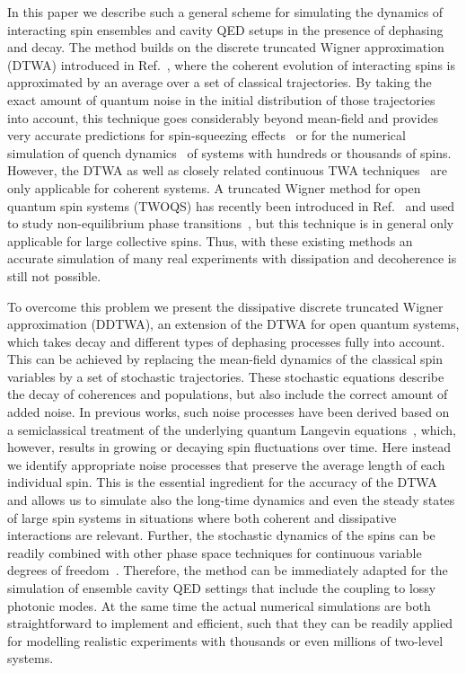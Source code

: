 \documentclass[pra,twocolumn,showpacs,preprintnumbers,amsmath,amssymb,superscriptaddress]{revtex4-1}
\newcommand{\pr}[1]{\textcolor{blue}{#1}}
\begin{document}
In this paper we describe such a general scheme for simulating the dynamics of interacting spin ensembles and cavity QED setups in the presence of dephasing and decay. The method builds on the discrete truncated Wigner approximation (DTWA) introduced in Ref.~\cite{Schachenmayer2015}, where the coherent evolution of interacting spins is approximated by an average over a set of classical trajectories. By taking the exact amount of quantum noise in the initial distribution of those trajectories into account, this technique goes considerably beyond mean-field and provides very accurate predictions for spin-squeezing effects~\cite{Zhu2019,Perlin2020} or for the numerical simulation of quench dynamics~\cite{Czischek2018,Khasseh2020} of systems with hundreds or thousands of spins. However, the DTWA as well as closely related continuous TWA techniques~\cite{Polkovnikov2010} are only applicable for coherent systems. A truncated Wigner method for open quantum spin systems (TWOQS) has recently been introduced in Ref.~\cite{Huber2021} and used to study non-equilibrium phase transitions~\cite{Huber2020}, but this technique is in general only applicable for large collective spins.
Thus, with these existing methods an accurate simulation of many real experiments with dissipation and decoherence is still not possible.


To overcome this problem we present the dissipative discrete truncated Wigner approximation (DDTWA), an extension of the DTWA for open quantum systems, which takes decay and different types of dephasing processes fully into account. This can be achieved by replacing the mean-field dynamics of the classical spin variables by a set of stochastic trajectories. These stochastic equations describe the decay of coherences and populations, but also include the correct amount of added noise. In previous works, such noise processes have been derived based on a semiclassical treatment of the underlying quantum Langevin equations~\cite{Liu2020,Jaeger2021}, which, however, results in  growing or decaying spin fluctuations over time. Here instead we identify appropriate noise processes that preserve the average length of each individual spin. This is the essential ingredient for the accuracy of the DTWA and allows us to simulate also the long-time dynamics and even the steady states of large spin systems in situations where both coherent and dissipative interactions are relevant. Further, the stochastic dynamics of the spins can be readily combined with other  phase space techniques for continuous variable degrees of freedom~\cite{Polkovnikov2010}. Therefore, the method can be immediately adapted for the simulation of ensemble cavity QED settings that include the coupling to lossy photonic modes. At the same time the actual numerical simulations are both straightforward to implement and efficient, such that they can be readily applied for modelling realistic experiments with thousands or even millions of two-level systems. 
\end{document}
